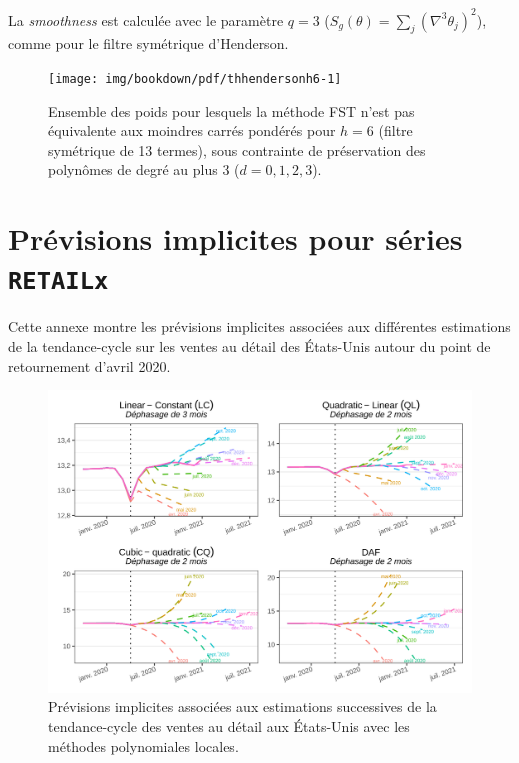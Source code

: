 \documentclass[
  12pt,
  a4paper,french]{article}
\newcommand\1{\mathds{1}}
\begin{document}
La \emph{smoothness} est calculée avec le paramètre \(q=3\) (\(S_g(\theta) = \sum_{j}(\nabla^{3}\theta_{j})^{2}\)), comme pour le filtre symétrique d'Henderson.

\begin{figure}[H]

{\centering \texttt{[image: img/bookdown/pdf/thhendersonh6-1]} 

}

\caption[Ensemble des poids pour lesquels la méthode FST n'est pas équivalente aux moindres carrés pondérés pour \(h=6\) (filtre symétrique de 13 termes), sous contrainte de préservation des polynômes de degré au plus 3 (\(d=0,1,2,3\))]{Ensemble des poids pour lesquels la méthode FST n'est pas équivalente aux moindres carrés pondérés pour \(h=6\) (filtre symétrique de 13 termes), sous contrainte de préservation des polynômes de degré au plus 3 (\(d=0,1,2,3\)).}\label{fig:thhendersonh6}

\footnotesize
\normalsize\end{figure}

\newpage

\hypertarget{an-implicitforecasts}{%
\section{\texorpdfstring{Prévisions implicites pour séries \texttt{RETAILx}}{Prévisions implicites pour séries RETAILx}}\label{an-implicitforecasts}}

Cette annexe montre les prévisions implicites associées aux différentes estimations de la tendance-cycle sur les ventes au détail des États-Unis autour du point de retournement d'avril 2020.

\begin{figure}

{\centering \includegraphics[width=0.9\linewidth]{img/nber/retailx_lp_implicit_forecast} 

}

\caption[Prévisions implicites associées aux estimations successives de la tendance-cycle des ventes au détail aux États-Unis avec les méthodes polynomiales locales]{Prévisions implicites associées aux estimations successives de la tendance-cycle des ventes au détail aux États-Unis avec les méthodes polynomiales locales.}\label{fig:retailxiplp}

\footnotesize
\normalsize\end{figure}
\end{document}
